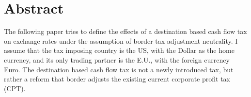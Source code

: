 \section*{Abstract}
The following paper tries to define the effects of a destination based cash flow tax on exchange rates under the assumption of border tax adjustment neutrality. I assume that the tax imposing country is the US, with the Dollar as the home currency, and its only trading partner is the E.U., with the foreign currency Euro. The destination based cash flow tax is not a newly introduced tax, but rather a reform that border adjusts the existing current corporate profit tax (CPT).